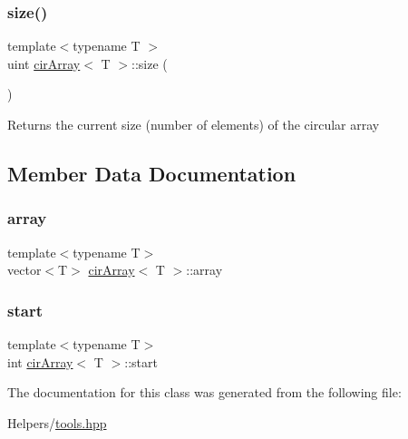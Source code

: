 \subsubsection{\texorpdfstring{size()}{size()}}
{\footnotesize\ttfamily template$<$typename T $>$ \\
uint \mbox{\hyperlink{classcirArray}{cir\+Array}}$<$ T $>$\+::size (\begin{DoxyParamCaption}{ }\end{DoxyParamCaption})}

Returns the current size (number of elements) of the circular array 

\subsection{Member Data Documentation}
\mbox{\label{classcirArray_ac0064a9a3b5f975c5cfea0909e4d4907}} 
\subsubsection{\texorpdfstring{array}{array}}
{\footnotesize\ttfamily template$<$typename T$>$ \\
vector$<$T$>$ \mbox{\hyperlink{classcirArray}{cir\+Array}}$<$ T $>$\+::array\hspace{0.3cm}{\ttfamily [private]}}

\mbox{\label{classcirArray_a7233e3d591e61dee5a16656f3db8f386}} 
\subsubsection{\texorpdfstring{start}{start}}
{\footnotesize\ttfamily template$<$typename T$>$ \\
int \mbox{\hyperlink{classcirArray}{cir\+Array}}$<$ T $>$\+::start\hspace{0.3cm}{\ttfamily [private]}}



The documentation for this class was generated from the following file\+:\begin{DoxyCompactItemize}
\item 
Helpers/\mbox{\hyperlink{tools_8hpp}{tools.\+hpp}}\end{DoxyCompactItemize}
